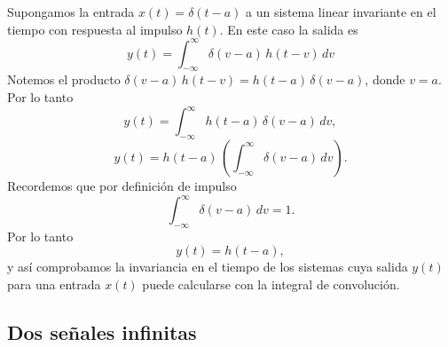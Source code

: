 Supongamos la entrada $x(t) = \delta(t- a)$ a un sistema linear invariante en el tiempo con respuesta al impulso $h(t)$.
En este caso la salida es
\begin{equation}
 y(t) = \int_{-\infty}^{\infty} \delta(v - a) \, h(t - v)  \, dv
\end{equation}
Notemos el producto $\delta(v - a) \, h(t - v) = h(t - a) \, \delta(v - a)$,
donde $v = a$. Por lo tanto
\begin{equation}
 y(t) = \int_{-\infty}^{\infty} h(t - a) \, \delta(v - a ) \, dv,
\end{equation}
\begin{equation}
 y(t) = h(t - a) \, \left( \int_{-\infty}^{\infty} \delta(v - a ) \, dv\right).
\end{equation}
Recordemos que por definición de impulso
\begin{equation}
 \int_{-\infty}^{\infty} \delta(v - a ) \, dv = 1.
\end{equation}
Por lo tanto
\begin{equation}
 y(t) = h(t - a),
\end{equation}
y así comprobamos la invariancia en el tiempo de los sistemas cuya salida $y(t)$ para una entrada $x(t)$ puede calcularse con la integral de convolución.


\subsection  {Dos se\~{n}ales infinitas}

